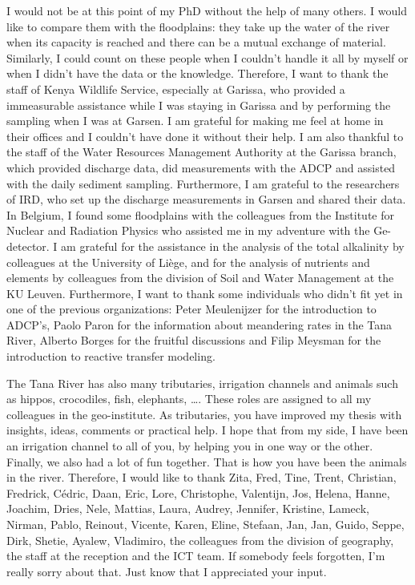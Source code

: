 I would not be at this point of my PhD without the help of many others. I would like to compare them with the floodplains: they take up the water of the river when its capacity is reached and there can be a mutual exchange of material. Similarly, I could count on these people when I couldn't handle it all by myself or when I didn't have the data or the knowledge. Therefore, I want to thank the staff of Kenya Wildlife Service, especially at Garissa, who provided a immeasurable assistance while I was staying in Garissa and by performing the sampling when I was at Garsen. I am grateful for making me feel at home in their offices and I couldn't have done it without their help. I am also thankful to the staff of the Water Resources Management Authority at the Garissa branch, which provided discharge data, did measurements with the ADCP and assisted with the daily sediment sampling. Furthermore, I am grateful to the researchers of IRD, who set up the discharge measurements in Garsen and shared their data. In Belgium, I found some floodplains with the colleagues from the Institute for Nuclear and Radiation Physics who assisted me in my adventure with the Ge-detector. I am grateful for the assistance in the analysis of the total alkalinity by colleagues at the University of Li\`ege, and for the analysis of nutrients and elements by colleagues from the division of Soil and Water Management at the KU Leuven. Furthermore, I want to thank some individuals who didn't fit yet in one of the previous organizations: Peter Meulenijzer for the introduction to ADCP's, Paolo Paron for the information about meandering rates in the Tana River, Alberto Borges for the fruitful discussions and Filip Meysman for the introduction to reactive transfer modeling.
\bigskip 

The Tana River has also many tributaries, irrigation channels and animals such as hippos, crocodiles, fish, elephants, \ldots. These roles are assigned to all my colleagues in the geo-institute. As tributaries, you have improved my thesis with insights, ideas, comments or practical help. I hope that from my side, I have been an irrigation channel to all of you, by helping you in one way or the other. Finally, we also had a lot of fun together. That is how  you have been the animals in the river. Therefore, I would like to thank Zita, Fred, Tine, Trent, Christian, Fredrick, C\'edric, Daan, Eric, Lore,  Christophe, Valentijn, Jos, Helena, Hanne, Joachim, Dries, Nele, Mattias, Laura, Audrey, Jennifer, Kristine, Lameck, Nirman, Pablo, Reinout, Vicente, Karen, Eline, Stefaan, Jan, Jan, Guido, Seppe, Dirk, Shetie, Ayalew, Vladimiro, the colleagues from the division of geography, the staff at the reception and the ICT team. If somebody feels forgotten, I'm really sorry about that. Just know that I appreciated your input.
\bigskip

